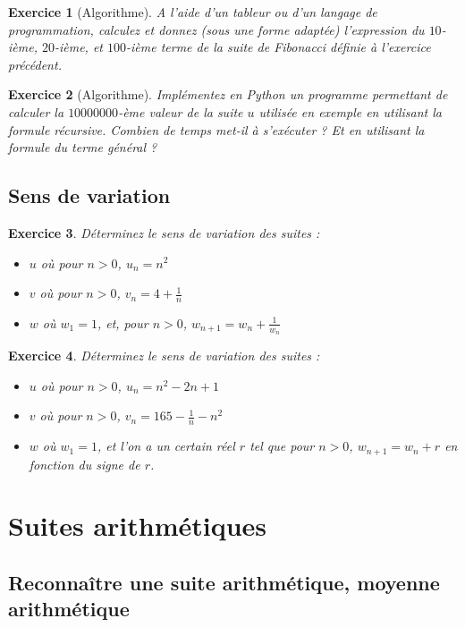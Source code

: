 \documentclass[10pt,a4paper]{article}
\newtheorem{exo}{Exercice}
\begin{document}
\begin{exo}[Algorithme]
    A l'aide d'un tableur ou d'un langage de programmation, calculez et donnez (sous une forme adaptée) l'expression du $10$-ième, $20$-ième, et $100$-ième terme de la suite de Fibonacci définie à l'exercice précédent.
\end{exo}

\begin{exo}[Algorithme]
Implémentez en Python un programme permettant de calculer la $10000000$-ème valeur de la suite $u$ utilisée en exemple en utilisant la formule récursive. Combien de temps met-il à s'exécuter ? Et en utilisant la formule du terme général ? 
\end{exo}


\subsection{Sens de variation}


\begin{exo}
Déterminez le sens de variation des suites :
    \begin{itemize}
        \item $u$ où pour $n> 0$, $u_{n}=n^2$
        \item $v$ où pour $n> 0$, $v_{n}=4 + \frac{1}{n}$
        \item $w$ où $w_1=1$, et, pour $n> 0$, $w_{n+1}=w_{n}+\frac{1}{w_{n}}$
    \end{itemize}
\end{exo}

 
\begin{exo}
Déterminez le sens de variation des suites :
    \begin{itemize}
        \item $u$ où pour $n> 0$, $u_{n}=n^2 - 2n + 1$
        \item $v$ où pour $n> 0$, $v_{n}=165 - \frac{1}{n} - n^2$
        \item $w$ où $w_1=1$, et l'on a un certain réel $r$ tel que pour $n> 0$, $w_{n+1}=w_{n}+r$ en fonction du signe de $r$.
    \end{itemize}
\end{exo}



\section{Suites arithmétiques}

\subsection{Reconnaître une suite arithmétique, moyenne arithmétique}
\end{document}
